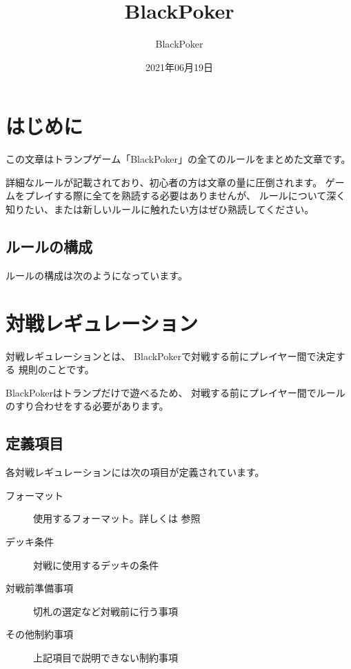 \documentclass[letterpaper,10pt,dvipdfmx]{sphinxmanual}
\title{BlackPoker}
\date{2021年06月19日}
\author{BlackPoker}
\begin{document}
\pagestyle{empty}
\sphinxmaketitle
\pagestyle{plain}
\sphinxtableofcontents
\pagestyle{normal}
\label{\detokenize{index::doc}}



\chapter{はじめに}
\label{\detokenize{init/init:id1}}\label{\detokenize{init/init::doc}}
この文章はトランプゲーム「BlackPoker」の全てのルールをまとめた文章です。

詳細なルールが記載されており、初心者の方は文章の量に圧倒されます。
ゲームをプレイする際に全てを熟読する必要はありませんが、
ルールについて深く知りたい、または新しいルールに触れたい方はぜひ熟読してください。


\section{ルールの構成}
\label{\detokenize{init/init:id2}}
ルールの構成は次のようになっています。

\noindent{}


\chapter{対戦レギュレーション}
\label{\detokenize{match-regulations/match-regulations:id1}}\label{\detokenize{match-regulations/match-regulations::doc}}
対戦レギュレーションとは、
BlackPokerで対戦する前にプレイヤー間で決定する
規則のことです。

BlackPokerはトランプだけで遊べるため、
対戦する前にプレイヤー間でルールのすり合わせをする必要があります。


\section{定義項目}
\label{\detokenize{match-regulations/match-regulations:id2}}
各対戦レギュレーションには次の項目が定義されています。
\begin{description}
\item[{フォーマット}] \leavevmode
使用するフォーマット。詳しくは {\hyperref[\detokenize{format/format::doc}]{}} 参照

\item[{デッキ条件}] \leavevmode
対戦に使用するデッキの条件

\item[{対戦前準備事項}] \leavevmode
切札の選定など対戦前に行う事項

\item[{その他制約事項}] \leavevmode
上記項目で説明できない制約事項

\end{description}
\end{document}
